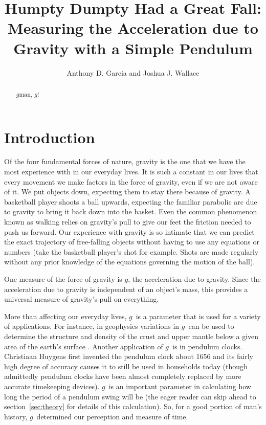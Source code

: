 \documentclass[iop]{emulateapj}
\def\g{$g$}
\begin{document}
\title{Humpty Dumpty Had a Great Fall: Measuring the Acceleration due to Gravity with a Simple Pendulum}

\author{ Anthony D. Garcia
and
Joshua J. Wallace}

\begin{abstract}

\g man, \g!

\end{abstract}

\section{Introduction}

Of the four fundamental forces of nature, gravity is the one that we have the 
most experience with in our everyday lives.  It is such a constant in our lives 
that every movement we make factors in the force of gravity, even if we are not
aware of it. We put objects down, expecting them to stay there because of 
gravity. A basketball player shoots a ball upwards, expecting the familiar 
parabolic arc due to gravity to bring it back down into the basket.  Even the
common phenomenon known as walking relies on gravity's pull to give our feet
the friction needed to push us forward. Our experience with gravity is so
intimate that we can predict the exact trajectory of free-falling objects 
without having to use any equations or numbers (take the basketball player's 
shot for example. Shots are made regularly without any prior knowledge of 
the equations governing the motion of the ball).

One measure of the force of gravity is \g, the acceleration due to gravity. 
Since the acceleration due to gravity is independent of an object's mass, 
this provides a universal measure of gravity's pull on everything.

More than affecting our everyday lives, \g\ is a parameter that is used 
for a variety of applications. For instance, in geophysics 
variations in \g\ can be used to determine the structure and density of the 
crust and upper mantle below a given area of the earth's surface \citet{Geo}.
Another application of \g\ is in pendulum clocks. Christiaan Huygens 
first invented the pendulum clock about 1656 \citet{Murin} and its fairly high 
degree of accuracy causes it to still be used in households today (though 
admittedly pendulum clocks have been almost completely replaced by more 
accurate time\-keeping devices).  \g\ is an important parameter in 
calculating how long the period of a pendulum swing will be (the eager reader 
can skip ahead to section~\ref{sec:theory} for details of this calculation).  
So, for a good 
portion of man's history, \g\ determined our perception and measure of time.
\end{document}
